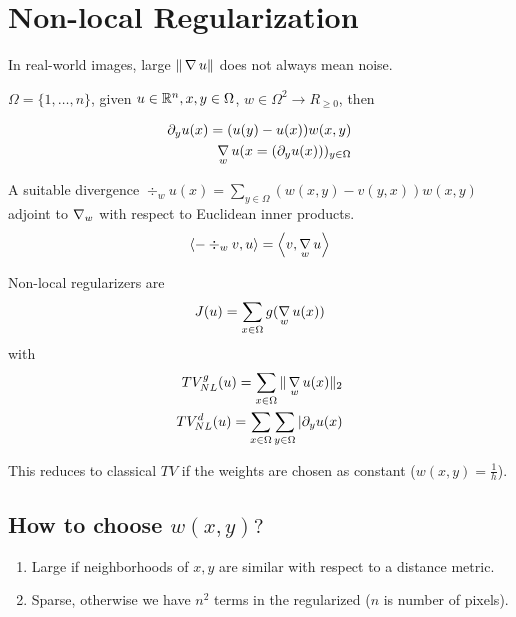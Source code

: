 \section{Non-local Regularization}
\label{sec:non-local-regul}

In real-world images, large $\| \operatorname*{\nabla} u \|$ does not always mean
noise.

\begin{defn}
  \label{defn:total_variation:1}
  $\Omega = \{ 1, \dots, n \}$, given $u \in \mathbb{R}^{n}, x, y \in \Omega$,
  $w \in \Omega^{2} \rightarrow R_{\geq 0}$, then 

  \begin{align}
    \label{eq:105}
    \partial_{y} u(x) = (u(y) - u(x)) w(x, y) \\
    \operatorname*{\nabla}_{w} u(x = (\partial_{y} u(x)))_{y \in \Omega}
  \end{align}

  A suitable divergence $\div_{w} u(x) = \sum_{y \in \Omega} (w(x, y) -
  v(y, x)) w(x, y)$ adjoint to $\operatorname*{\nabla}_{w}$ with respect to Euclidean
  inner products.
  \begin{align}
    \label{eq:106}
    \IP{- \div_{w} v, u} = \IP{v, \grad_{w} u}
  \end{align}

  Non-local regularizers are
  \begin{align}
    \label{eq:107}
    J(u) = \sum_{x \in \Omega} g(\operatorname*{\nabla}_{w} u(x))
  \end{align} with
  \begin{align}
    \label{eq:108}
    TV_{NL}^{g}(u) = \sum_{x \in \Omega} \| \operatorname*{\nabla}_{w} u(x) \|_{2} \\
    TV_{NL}^{d}(u) = \sum_{x \in \Omega} \sum_{y \in \Omega}
    | \partial_{y} u(x)
  \end{align}
\end{defn}

This reduces to classical $TV$ if the weights are chosen as constant
($w(x, y) = \frac{1}{h}$).

\subsection{How to choose $w(x, y)?$}
\label{sec:how-choose-wx}

\begin{enumerate}
\item Large if neighborhoods of $x, y$ are similar with respect to a
  distance metric.
\item Sparse, otherwise we have $n^{2}$ terms in the regularized ($n$
  is number of pixels).
\end{enumerate}

